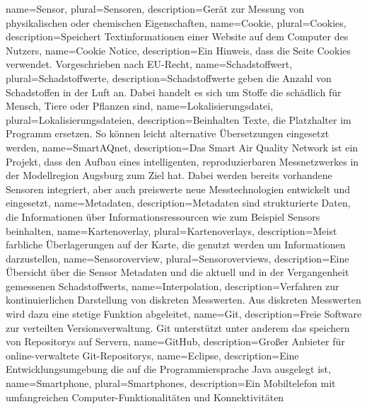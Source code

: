 {
	name=Sensor,
	plural=Sensoren,
	description={Gerät zur Messung von physikalischen oder chemischen Eigenschaften},
}
{
	name=Cookie,
	plural=Cookies,
	description={Speichert Textinformationen einer Website auf dem Computer des Nutzers},
}
{
	name=Cookie Notice,
	description={Ein Hinweis, dass die Seite Cookies verwendet. Vorgeschrieben nach EU-Recht},
}
{
	name=Schadstoffwert,
	plural=Schadstoffwerte,
	description={Schadstoffwerte geben die Anzahl von Schadstoffen in der Luft an. Dabei handelt es sich um Stoffe die schädlich für Mensch, Tiere oder Pflanzen sind},
}
{
	name=Lokalisierungsdatei,
	plural=Lokalisierungsdateien,
	description={Beinhalten Texte, die Platzhalter im Programm ersetzen. So können leicht alternative Übersetzungen eingesetzt werden},
}
{
	name=SmartAQnet,
	description={Das Smart Air Quality Network ist ein Projekt, dass den Aufbau eines intelligenten, reproduzierbaren Messnetzwerkes in der Modellregion Augsburg zum Ziel hat. Dabei werden bereits vorhandene Sensoren integriert, aber auch preiswerte neue Messtechnologien entwickelt und eingesetzt},
}
{
	name=Metadaten,
	description={Metadaten sind strukturierte Daten, die Informationen über Informationsressourcen wie zum Beispiel \glspl{Sensor} beinhalten},
}
{
	name=Kartenoverlay,
	plural=Kartenoverlays,
	description={Meist farbliche Überlagerungen auf der Karte, die genutzt werden um Informationen darzustellen},
}
{
	name=Sensoroverview,
	plural=Sensoroverviews,
	description={Eine Übersicht über die \gls{Sensor} \gls{Metadaten} und die aktuell und in der Vergangenheit gemessenen \glspl{Schadstoffwert}},
}
{
	name=Interpolation,
	description={Verfahren zur kontinuierlichen Darstellung von diskreten Messwerten. Aus diskreten Messwerten wird dazu eine stetige Funktion abgeleitet},
}
{
	name=Git,
	description={Freie Software zur verteilten Versionsverwaltung. Git unterstützt unter anderem das speichern von \glspl{Repository} auf Servern},
}
{
	name=GitHub,
	description={Großer Anbieter für online-verwaltete \gls{Git}-\glspl{Repository}},
}
{
	name=Eclipse,
	description={Eine Entwicklungsumgebung die auf die Programmiersprache Java ausgelegt ist},
}
{
	name=Smartphone,
	plural=Smartphones,
	description={Ein Mobiltelefon mit umfangreichen Computer-Funktionalitäten und Konnektivitäten}
}
